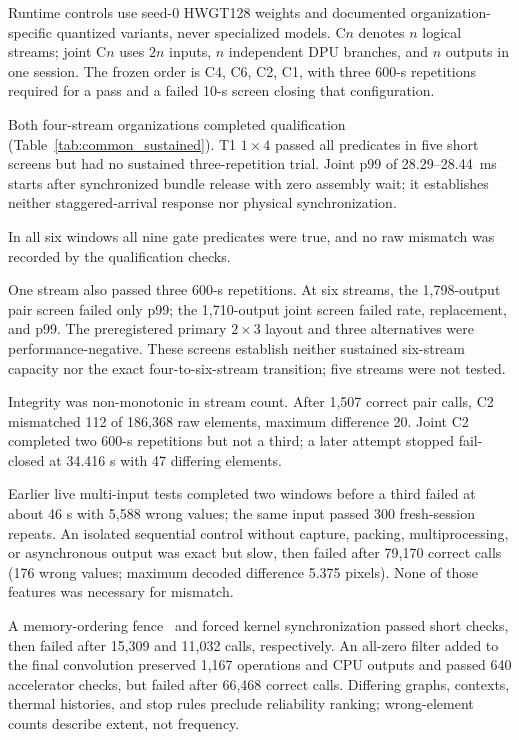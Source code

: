 \documentclass[sigconf,review,anonymous]{acmart}
\begin{document}
Runtime controls use seed-0 HWGT128 weights and documented organization-specific quantized variants, never specialized models. C$n$ denotes $n$ logical streams; joint C$n$ uses $2n$ inputs, $n$ independent DPU branches, and $n$ outputs in one session. The frozen order is C4, C6, C2, C1, with three 600-s repetitions required for a pass and a failed 10-s screen closing that configuration.

Both four-stream organizations completed qualification (Table~\ref{tab:common_sustained}). T1 $1\times4$ passed all predicates in five short screens but had no sustained three-repetition trial. Joint p99 of 28.29--28.44~ms starts after synchronized bundle release with zero assembly wait; it establishes neither staggered-arrival response nor physical synchronization.

In all six windows all nine gate predicates were true, and no raw mismatch was recorded by the qualification checks.

One stream also passed three 600-s repetitions. At six streams, the 1,798-output pair screen failed only p99; the 1,710-output joint screen failed rate, replacement, and p99. The preregistered primary $2\times3$ layout and three alternatives were performance-negative. These screens establish neither sustained six-stream capacity nor the exact four-to-six-stream transition; five streams were not tested.

Integrity was non-monotonic in stream count. After 1,507 correct pair calls, C2 mismatched 112 of 186,368 raw elements, maximum difference 20. Joint C2 completed two 600-s repetitions but not a third; a later attempt stopped fail-closed at 34.416 s with 47 differing elements.

Earlier live multi-input tests completed two windows before a third failed at about 46 s with 5,588 wrong values; the same input passed 300 fresh-session repeats. An isolated sequential control without capture, packing, multiprocessing, or asynchronous output was exact but slow, then failed after 79,170 correct calls (176 wrong values; maximum decoded difference 5.375 pixels). None of those features was necessary for mismatch.

A memory-ordering fence~\cite{amdsyncfence} and forced kernel synchronization passed short checks, then failed after 15,309 and 11,032 calls, respectively. An all-zero filter added to the final convolution preserved 1,167 operations and CPU outputs and passed 640 accelerator checks, but failed after 66,468 correct calls. Differing graphs, contexts, thermal histories, and stop rules preclude reliability ranking; wrong-element counts describe extent, not frequency.
\end{document}
